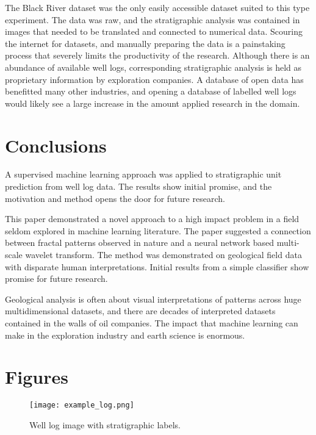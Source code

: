 \documentclass{article} %
\begin{document}
The Black River dataset was the only easily accessible dataset suited to this
type experiment. The data was raw, and the stratigraphic analysis was
contained in images that needed to be translated and connected to
numerical data. Scouring the internet for datasets, and manually
preparing the data is a painstaking process that severely limits the
productivity of the research. Although there is an abundance of
available well logs, corresponding stratigraphic analysis is held as
proprietary information by exploration companies. A database of open
data has benefitted many other industries, and opening a database of
labelled well logs would likely see a large increase in the
amount applied research in the domain.

\section{Conclusions}

A supervised machine learning approach was applied to stratigraphic
unit prediction from well log data. The results show initial promise, and
the motivation and method opens the door for future research.

This paper demonstrated a novel approach to a high impact problem in
a field seldom explored in machine learning literature. The paper
suggested a connection between fractal patterns observed in
nature and a neural network based multi-scale wavelet transform. The
method was demonstrated on geological field data with disparate human
interpretations. Initial results from a simple classifier show promise
for future research.

Geological analysis is often about visual interpretations
of patterns across huge multidimensional datasets, and there are
decades of interpreted datasets contained in the walls of oil
companies. The impact that machine learning can make in the exploration industry
and earth science is enormous. 
\newpage

\section{Figures}

\begin{figure}[H]
\begin{center}
\texttt{[image: example\_log.png]}
\end{center}
\caption{Well log image with stratigraphic labels.}
\label{fig:log}
\end{figure}
\end{document}
